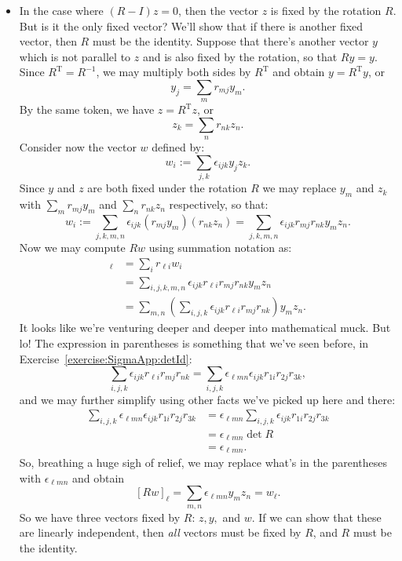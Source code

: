 \begin{itemize}
\item
In the case where $(R-I)z = 0$, then the vector $z$ is fixed by the rotation $R$. But is it the only fixed vector?  We'll show that if there is another fixed vector, then $R$ must be the identity.  Suppose that there's another vector $y$ which is not parallel to $z$ and is also fixed by the rotation, so that $Ry=y$. Since $R^{\text{T}}=R^{-1}$, we may multiply both sides by $R^{\text{T}}$ and obtain $y = R^{\text{T}}y$, or
\[ y_j = \sum_m r_{mj} y_m .\]
By the same token, we have $z = R^{\text{T}}z$, or
\[ z_k = \sum_n r_{nk} z_n .\]
Consider now the vector $w$ defined by:  
\[ w_i := \sum_{j,k}\epsilon_{ijk}y_jz_k. \]  
Since $y$ and $z$ are both fixed under the rotation $R$ we may replace $y_m$ and $z_k$ with $ \sum_m r_{mj} y_m$ and $\sum_n r_{nk} z_n$ respectively, so that:
\[ w_i := \sum_{j,k,m,n}\epsilon_{ijk}(r_{mj} y_m) (r_{nk} z_n) = \sum_{j,k,m,n}\epsilon_{ijk}r_{mj}r_{nk} y_m  z_n. \]  
Now we may compute $Rw$  using summation notation as:
\begin{align*}
[Rw]_{\ell} &= \sum_i r_{\ell i} w_i  \\
&= \sum_{i,j,k,m,n}\epsilon_{ijk}r_{\ell i}r_{mj}r_{nk} y_m  z_n \\
&= \sum_{m,n} \left( \sum_{i,j,k}\epsilon_{ijk}r_{\ell i}r_{mj}r_{nk} \right) y_m  z_n.
\end{align*}
It looks like we're venturing deeper and deeper into mathematical muck. But lo! The expression in parentheses is something that we've seen  before, in Exercise~\ref{exercise:SigmaApp:detId}:
\[ \sum_{i,j,k}\epsilon_{ijk}r_{\ell i}r_{mj}r_{nk}= \sum_{i,j,k} \epsilon_{\ell m n} \epsilon_{ijk}r_{1 i}r_{2j}r_{3k},\]
and we may further simplify using other facts we've picked up here and there:
\begin{align*}
 \sum_{i,j,k} \epsilon_{\ell m n} \epsilon_{ijk}r_{1 i}r_{2j}r_{3k}
&= \epsilon_{\ell m n} \sum_{i,j,k}  \epsilon_{ijk}r_{1 i}r_{2j}r_{3k}\\
&= \epsilon_{\ell m n} \det{R}\\
&= \epsilon_{\ell m n}.
\end{align*}
So, breathing a huge sigh of relief, we may replace what's in the parentheses with  $\epsilon_{\ell m n}$ and 
obtain
\[
[Rw]_{\ell} = \sum_{m,n} \epsilon_{\ell mn} y_m  z_n = w_{\ell}.
\]
So we have three vectors fixed by $R$:  $z,y,$ and $w$.  If we can show that these are linearly independent, then \emph{all} vectors must be fixed by $R$, and $R$ must be the identity. 


\end{itemize}
